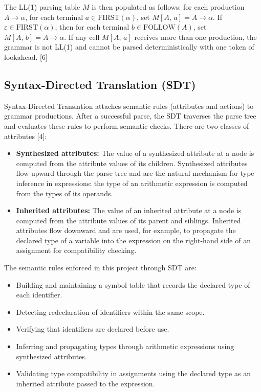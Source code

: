 \documentclass[letterpaper,12pt,oneside]{article}
\begin{document}
The LL(1) parsing table $M$ is then populated as follows: for each
production $A \rightarrow \alpha$, for each terminal
$a \in \text{FIRST}(\alpha)$, set $M[A,\, a] = A \rightarrow \alpha$. If $\varepsilon \in \text{FIRST}(\alpha)$, then for each terminal $b \in \text{FOLLOW}(A)$, set $M[A,\, b] = A \rightarrow \alpha$. If any cell $M[A,\, a]$ receives more than one production, the grammar is not LL(1) and cannot be parsed deterministically with one token of lookahead. [6]

\subsection{Syntax-Directed Translation (SDT)}

Syntax-Directed Translation attaches semantic rules (attributes and actions) to grammar productions. After a successful parse, the SDT traverses the parse tree and evaluates these rules to perform semantic checks. There are two classes of attributes [4]:

\begin{itemize}
    \item \textbf{Synthesized attributes:} The value of a synthesized attribute at a node is computed from the attribute values of its children. Synthesized attributes flow upward through the parse tree and are the natural mechanism for type inference in expressions: the type of an arithmetic expression is computed from the types of its operands.
    \item \textbf{Inherited attributes:} The value of an inherited attribute at a node is computed from the attribute values of its parent and siblings. Inherited attributes flow downward and are used, for example, to propagate the declared type of a variable into the expression on the right-hand side of an assignment for compatibility checking.
\end{itemize}

The semantic rules enforced in this project through SDT are:

\begin{itemize}
    \item Building and maintaining a symbol table that records the declared type of each identifier.
    \item Detecting redeclaration of identifiers within the same scope.
    \item Verifying that identifiers are declared before use.
    \item Inferring and propagating types through arithmetic expressions using synthesized attributes.
    \item Validating type compatibility in assignments using the declared type as an inherited attribute passed to the expression.
\end{itemize}
\end{document}
